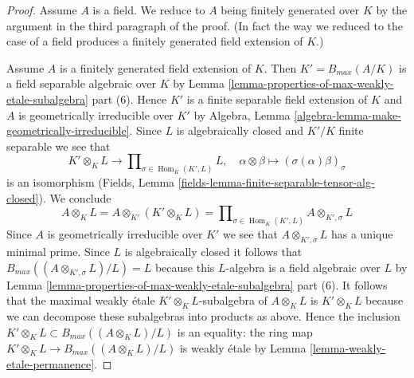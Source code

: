 \documentclass[10pt,a4paper]{amsart}
\theoremstyle{plain}
\theoremstyle{definition}
\theoremstyle{remark}
\numberwithin{equation}{subsection}
\def\Hom{\mathop{\mathrm{Hom}}\nolimits}
\begin{document}
\begin{proof}
\medskip\noindent
Assume $A$ is a field. We reduce to $A$ being finitely generated
over $K$ by the argument in the third paragraph of the proof.
(In fact the way we reduced to the case of a field produces
a finitely generated field extension of $K$.)

\medskip\noindent
Assume $A$ is a finitely generated field extension of $K$.
Then $K' = B_{max}(A/K)$ is a field separable algebraic over $K$ by
Lemma \ref{lemma-properties-of-max-weakly-etale-subalgebra} part (6).
Hence $K'$ is a finite separable field extension
of $K$ and $A$ is geometrically irreducible over $K'$ by
Algebra, Lemma \ref{algebra-lemma-make-geometrically-irreducible}.
Since $L$ is algebraically closed and $K'/K$ finite separable
we see that
$$
K' \otimes_K L \to \prod\nolimits_{\sigma \in \Hom_K(K', L)} L,\quad
\alpha \otimes \beta \mapsto (\sigma(\alpha)\beta)_\sigma
$$
is an isomorphism
(Fields, Lemma \ref{fields-lemma-finite-separable-tensor-alg-closed}).
We conclude
$$
A \otimes_K L = A \otimes_{K'} (K' \otimes_K L) =
\prod\nolimits_{\sigma \in \Hom_K(K', L)} A \otimes_{K', \sigma} L
$$
Since $A$ is geometrically irreducible over $K'$ we see that
$A \otimes_{K', \sigma} L$ has a unique minimal prime.
Since $L$ is algebraically closed it follows that
$B_{max}((A \otimes_{K', \sigma} L)/L) = L$
because this $L$-algebra is a field algebraic over $L$ by
Lemma \ref{lemma-properties-of-max-weakly-etale-subalgebra} part (6).
It follows that the maximal weakly \'etale $K' \otimes_K L$-subalgebra
of $A \otimes_K L$ is $K' \otimes_K L$ because we can decompose
these subalgebras into products as above. Hence the inclusion
$K' \otimes_K L \subset B_{max}((A \otimes_K L)/L)$ is an
equality: the ring map $K' \otimes_K L \to B_{max}((A \otimes_K L)/L)$
is weakly \'etale by
Lemma \ref{lemma-weakly-etale-permanence}.
\end{proof}
\end{document}
